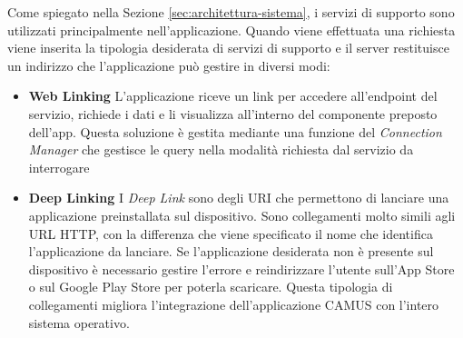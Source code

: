 Come spiegato nella Sezione \ref{sec:architettura-sistema}, i servizi di supporto sono utilizzati principalmente nell'applicazione. Quando viene effettuata una richiesta viene inserita la tipologia desiderata di servizi di supporto e il server restituisce un indirizzo che l'applicazione può gestire in diversi modi:
\begin{itemize}
	\item \textbf{Web Linking} L'applicazione riceve un link per accedere all'endpoint del servizio, richiede i dati e li visualizza all'interno del componente preposto dell'app. Questa soluzione è gestita mediante una funzione del \emph{Connection Manager} che gestisce le query nella modalità richiesta dal servizio da interrogare
	\item \textbf{Deep Linking} I \emph{Deep Link} sono degli URI che permettono di lanciare una applicazione preinstallata sul dispositivo. Sono collegamenti molto simili agli URL HTTP, con la differenza che viene specificato il nome che identifica l'applicazione da lanciare. Se l'applicazione desiderata non è presente sul dispositivo è necessario gestire l'errore e reindirizzare l'utente sull'App Store o sul Google Play Store per poterla scaricare. Questa tipologia di collegamenti migliora l'integrazione dell'applicazione CAMUS con l'intero sistema operativo. 
\end{itemize}
	 
